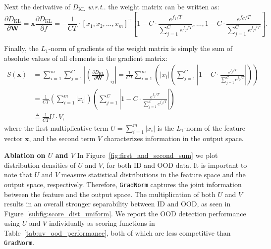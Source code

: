 \documentclass{article}
\makeatletter
\def\*#1{\mathbf{#1}}
\DeclareRobustCommand\onedot{\futurelet\@let@token\@onedot}
\def\@onedot{\ifx\@let@token.\else.\null\fi\xspace}
\def\wrt{\emph{w.r.t}\onedot} \def\dof{d.o.f\onedot}
\makeatother
\begin{document}
Next the derivative of $ D_\text{KL}$ \wrt the weight matrix can be written as:
\begin{equation*}
        \frac{\partial  D_\text{KL}}{\partial \mathbf{W}} = \mathbf{x} \frac{\partial  D_\text{KL}}{\partial f} 
        = -\frac{1}{CT} \cdot [x_1, x_2, \dots, x_m]^{\top}
        [1 - C \cdot \frac{e^{f_1 / T}}{\sum_{j=1}^C e^{{f_{j}} / T}}, \dots, 1 - C \cdot \frac{e^{f_C / T}}{\sum_{j=1}^C e^{{f_{j}} / T}}].
\end{equation*}

Finally, the $L_1$-norm of gradients of the weight matrix is simply the sum of absolute values of all elements in the gradient matrix:
\begin{equation}
    \begin{split}
        S(\*x) &= \sum_{i=1}^m \sum_{j=1}^C \left|\left(\frac{\partial  D_\text{KL}}{\partial \mathbf{W}}\right)_{ij}\right| = \frac{1}{CT} \sum_{i=1}^m \left( |x_i| \left(\sum_{j=1}^C \left|1 - C \cdot \frac{e^{f_j / T}}{\sum_{j=1}^C e^{{f_{j}} / T}}\right|\right)\right) \\
        &= \frac{1}{CT}  \left(\sum_{i=1}^m |x_i|\right) \left(\sum_{j=1}^C \left|1 - C \cdot \frac{e^{f_j / T}}{\sum_{j=1}^C e^{{f_{j}} / T}}\right|\right) \\
        & \triangleq \frac{1}{CT} U \cdot V,
    \end{split}
    \label{eq:decomp}
\end{equation}
where the first multiplicative term $U=\sum_{i=1}^m |x_i|$ is the $L_1$-norm of the feature vector $\*x$, and the second term $V$ characterizes information in the output space. 


\textbf{Ablation on $U$ and $V$} In Figure~\ref{fig:first_and_second_sum} we plot distribution densities of $U$ and $V$, for both ID and OOD data. %
It is important to note that $U$ and $V$ measure statistical distributions in the feature space and the output space, respectively. Therefore, \texttt{GradNorm} captures the joint information between the feature and the output space. The multiplication of both $U$ and $V$ results in an overall stronger separability between ID and OOD, as seen in Figure~\ref{subfig:score_dist_uniform}. We report the OOD detection performance using $U$ and $V$ individually as scoring functions in Table~\ref{tab:uv_ood_performance}, both of which are less competitive than \texttt{GradNorm}.
\end{document}

